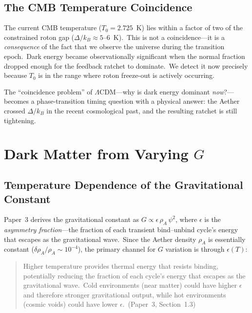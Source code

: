 \documentclass[12pt,letterpaper]{article}
\newcommand{\rhoa}{\rho_{\!A}}
\begin{document}
\subsection{The CMB Temperature Coincidence}

The current CMB temperature ($T_0 = 2.725$~K) lies within a factor of two of
the constrained roton gap ($\Delta/k_B \approx 5$--$6$~K).\ This is not a
coincidence---it is a \emph{consequence} of the fact that we observe the universe
during the transition epoch.\ Dark energy became observationally significant when
the normal fraction dropped enough for the feedback ratchet to dominate.\ We
detect it now precisely because $T_0$ is in the range where roton freeze-out
is actively occurring.

The ``coincidence problem'' of $\Lambda$CDM---why is dark energy dominant
\emph{now}?---becomes a phase-transition timing question with a physical answer:
the Aether crossed $\Delta/k_B$ in the recent cosmological past, and the
resulting ratchet is still tightening.


\section{Dark Matter from Varying \texorpdfstring{$G$}{G}}
\label{sec:dark-matter}

\subsection{Temperature Dependence of the Gravitational Constant}

Paper~3 derives the gravitational constant as $G \propto \epsilon\,\rhoa\,\psi^2$,
where $\epsilon$ is the \emph{asymmetry fraction}---the fraction of each transient
bind--unbind cycle's energy that escapes as the gravitational wave.\ Since the
Aether density $\rhoa$ is essentially constant ($\delta\rhoa/\rhoa \sim 10^{-4}$),
the primary channel for $G$ variation is through $\epsilon(T)$:

\begin{quote}
Higher temperature provides thermal energy that resists binding, potentially
reducing the fraction of each cycle's energy that escapes as the gravitational
wave.\ Cold environments (near matter) could have higher $\epsilon$ and therefore
stronger gravitational output, while hot environments (cosmic voids) could have
lower $\epsilon$.\ (Paper~3, Section~1.3)
\end{quote}
\end{document}
